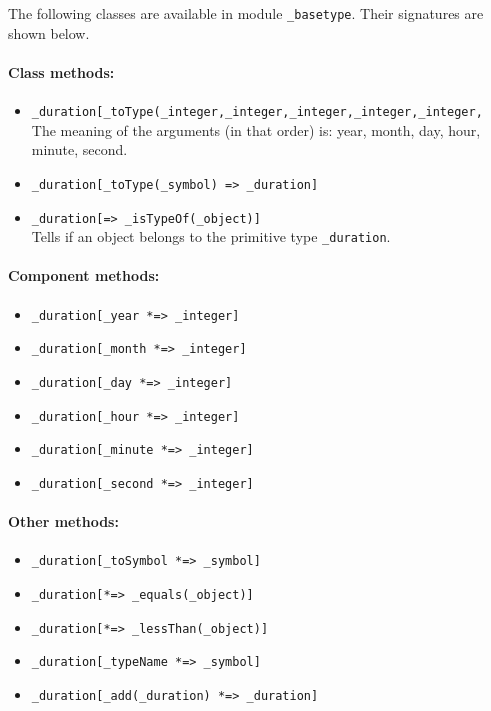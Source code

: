 \documentclass[11pt]{article}
\begin{document}
The following classes are available in module {\tt \_basetype}.
Their signatures are shown below.
\paragraph{Class methods:}
\begin{itemize}
\item
  {\tt \_duration[\_toType(\_integer,\_integer,\_integer,\_integer,\_integer,}
    \hspace*{5cm}{\tt \_integer) => \_duration]}
  \\
  The meaning of the arguments (in that order) is: year, month, day, hour, minute, second.
\item
  {\tt \_duration[\_toType(\_symbol) => \_duration]}
\item
  {\tt \_duration[=> \_isTypeOf(\_object)]}
  \\
  Tells if an object belongs to the primitive type {\tt \_duration}.  
\end{itemize}

\paragraph{Component methods:}
\begin{itemize}
      \item {\tt \_duration[\_year *=> \_integer]}  
      \item {\tt \_duration[\_month *=> \_integer]}  
      \item {\tt \_duration[\_day *=> \_integer]}  
      \item {\tt \_duration[\_hour *=> \_integer]}
      \item {\tt \_duration[\_minute *=> \_integer]}  
      \item {\tt \_duration[\_second *=> \_integer]}   
    \end{itemize}

\paragraph{Other methods:}
\begin{itemize}
\item {\tt \_duration[\_toSymbol *=> \_symbol]}  
\item {\tt \_duration[*=> \_equals(\_object)]}  
\item {\tt \_duration[*=> \_lessThan(\_object)]}  
\item {\tt \_duration[\_typeName *=> \_symbol]}  
\item {\tt \_duration[\_add(\_duration) *=> \_duration]}  
\end{itemize}
\end{document}
